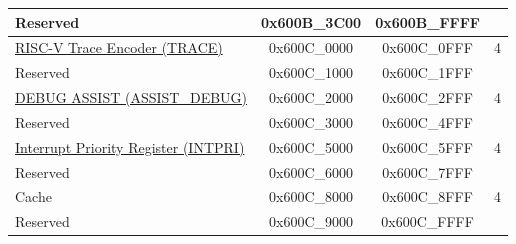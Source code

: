 \begin{ThreePartTable}
\begin{longtable}[c]{ |p{7cm}|c|c|r| }
    \rowcolor{gray!25}  Reserved                    & 0x600B\_3C00 & 0x600B\_FFFF &         \\\hline
\hyperref[mod:riscvtracenc]{RISC-V Trace Encoder (TRACE)}
& 0x600C\_0000 & 0x600C\_0FFF &   4     \\\hline
    \rowcolor{gray!25}  Reserved                    & 0x600C\_1000 & 0x600C\_1FFF &         \\\hline
\hyperref[mod:dbgassist]{DEBUG ASSIST  (ASSIST\_DEBUG)}\tnote{\textcolor{red}{*}}               & 0x600C\_2000 & 0x600C\_2FFF &   4     \\\hline
    \rowcolor{gray!25}  Reserved                    & 0x600C\_3000 & 0x600C\_4FFF &         \\\hline
\hyperref[mod:riscvcpu]{Interrupt Priority Register (INTPRI)}                 & 0x600C\_5000 & 0x600C\_5FFF &   4     \\\hline
    \rowcolor{gray!25}  Reserved                    & 0x600C\_6000 & 0x600C\_7FFF &         \\\hline
Cache                & 0x600C\_8000 & 0x600C\_8FFF &   4     \\\hline
    \rowcolor{gray!25}  Reserved                    & 0x600C\_9000 & 0x600C\_FFFF &         \\\hline

\end{longtable}
\end{ThreePartTable}

